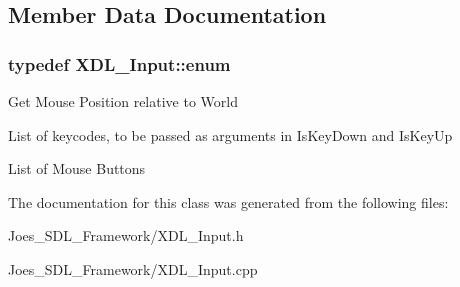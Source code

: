 \subsection{Member Data Documentation}
\hypertarget{class_x_d_l___input_a9f4f7d829c9e50b0556aa9848243b098}{
\subsubsection[{enum}]{\setlength{\rightskip}{0pt plus 5cm}typedef X\-D\-L\-\_\-\-Input\-::enum}}\label{class_x_d_l___input_a9f4f7d829c9e50b0556aa9848243b098}
Get Mouse Position relative to World

List of keycodes, to be passed as arguments in Is\-Key\-Down and Is\-Key\-Up

List of Mouse Buttons 

The documentation for this class was generated from the following files\-:\begin{DoxyCompactItemize}
\item 
Joes\-\_\-\-S\-D\-L\-\_\-\-Framework/X\-D\-L\-\_\-\-Input.\-h\item 
Joes\-\_\-\-S\-D\-L\-\_\-\-Framework/X\-D\-L\-\_\-\-Input.\-cpp\end{DoxyCompactItemize}
